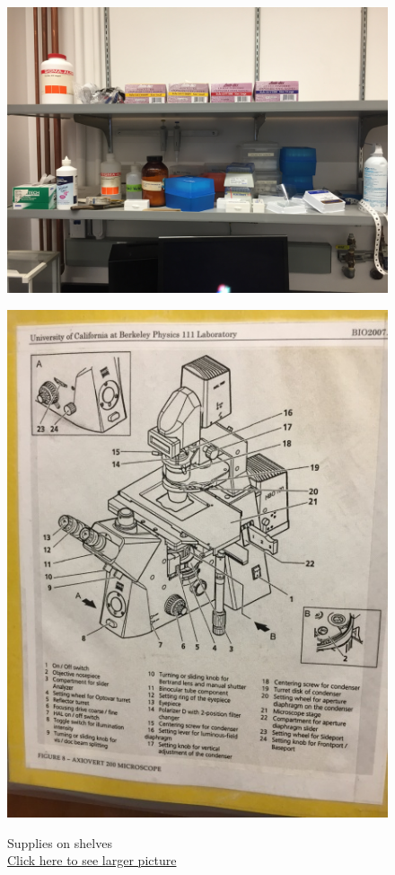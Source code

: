 \documentclass{../lab}
\begin{document}
\begin{figure}[H]
  \href{http://experimentationlab.berkeley.edu/sites/default/files/upimages/BMC\%20Supplies\%20on\%20Shelves_2541.JPG}{\includegraphics[width=\linewidth,keepaspectratio]{images/IMG_2541.JPG}}
  \caption{Supplies on shelves \\ \href{http://experimentationlab.berkeley.edu/sites/default/files/upimages/BMC\%20Supplies\%20on\%20Shelves_2541.JPG}{Click here to see larger picture}}
  \label{fig:Supplies}
\endminipage\hfill
{}
  \href{http://experimentationlab.berkeley.edu/sites/default/files/upimages/2_Legend-Microscope_2540.JPG}{\includegraphics[width=\linewidth,keepaspectratio]{images/2_Legend-Microscope_2540.JPG}}

\end{figure}
\end{document}
